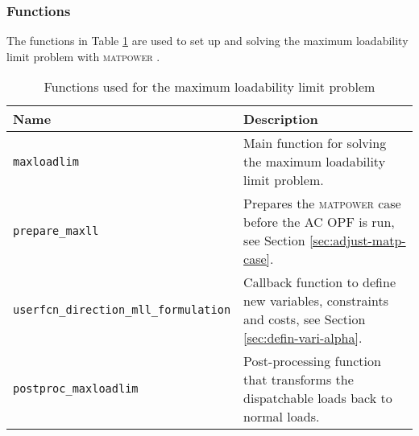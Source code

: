 \documentclass[12pt,a4]{article}
\newcommand*{\codemat}[1]{\texttt{#1}}
\newcommand*{\matpower}{\textsc{matpower} }
\begin{document}
\subsubsection{Functions}
\label{sec:functions}

The functions in Table \ref{tab:functions} are used to set up and solving the maximum loadability limit problem with \matpower.

\begin{table}[!h]
  \centering
  \begin{tabular}{lp{8cm}}
  \toprule
  Name  & Description \\
  \midrule
  \codemat{maxloadlim} & Main function for solving the maximum loadability limit problem.\\
  \codemat{prepare\_maxll} & Prepares the \matpower case before the AC OPF is run, see Section \ref{sec:adjust-matp-case}.\\
  \codemat{userfcn\_direction\_mll\_formulation} & Callback function to define new variables, constraints and costs, see Section \ref{sec:defin-vari-alpha}. \\
  \codemat{postproc\_maxloadlim} & Post-processing function that transforms the dispatchable loads back to normal loads.\\
  \bottomrule
  \end{tabular}
  \caption{Functions used for the maximum loadability limit problem}
  \label{tab:functions}
\end{table}
\end{document}
